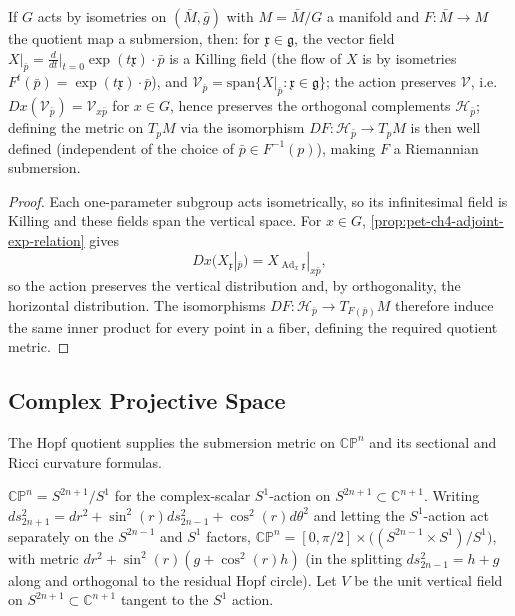 \begin{proposition}
  \label{prop:pet-ch4-group-action-submersion}
  If $G$ acts by isometries on $(\bar M,\bar g)$ with $M=\bar M/G$ a manifold
  and $F:\bar M\to M$ the quotient map a submersion, then: for
  $\mathfrak x\in\mathfrak g$, the vector field
  $X|_{\bar p}=\tfrac{d}{dt}\big|_{t=0}\exp(t\mathfrak x)\cdot\bar p$ is a
  Killing field (the flow of $X$ is by isometries $F^t(\bar p)=\exp(t\mathfrak x)\cdot\bar p$),
  and $\mathcal V_{\bar p}=\mathrm{span}\{X|_{\bar p}:\mathfrak x\in\mathfrak g\}$;
  the action preserves $\mathcal V$, i.e.\ $Dx(\mathcal V_{\bar p})=\mathcal V_{x\bar p}$
  for $x\in G$, hence preserves the orthogonal complements $\mathcal H_{\bar p}$;
  defining the metric on $T_pM$ via the isomorphism $DF:\mathcal H_{\bar p}\to T_pM$
  is then well defined (independent of the choice of $\bar p\in F^{-1}(p)$),
  making $F$ a Riemannian submersion.
\end{proposition}
\begin{proof}
  \sketch
  Each one-parameter subgroup acts isometrically, so its infinitesimal field is
  Killing and these fields span the vertical space. For $x\in G$,
  \cref{prop:pet-ch4-adjoint-exp-relation} gives
  \[
    Dx(X_{\mathfrak x}|_{\bar p})
    =X_{\operatorname{Ad}_x\mathfrak x}|_{x\bar p},
  \]
  so the action preserves the vertical distribution and, by orthogonality, the
  horizontal distribution. The isomorphisms
  $DF:\mathcal H_{\bar p}\to T_{F(\bar p)}M$ therefore induce the same inner
  product for every point in a fiber, defining the required quotient metric.
\end{proof}


\subsection{Complex Projective Space}

The Hopf quotient supplies the submersion metric on $\mathbb{CP}^n$ and its
sectional and Ricci curvature formulas.

\begin{definition}
  \label{def:pet-ch4-cpn-submersion-setup}
  $\mathbb{CP}^n=S^{2n+1}/S^1$ for the complex-scalar $S^1$-action on
  $S^{2n+1}\subset\mathbb{C}^{n+1}$. Writing
  $ds_{2n+1}^2=dr^2+\sin^2(r)ds_{2n-1}^2+\cos^2(r)d\theta^2$ and letting the
  $S^1$-action act separately on the $S^{2n-1}$ and $S^1$ factors,
  $\mathbb{CP}^n=[0,\pi/2]\times\big((S^{2n-1}\times S^1)/S^1\big)$, with metric
  $dr^2+\sin^2(r)(g+\cos^2(r)h)$ (in the splitting $ds_{2n-1}^2=h+g$ along and
  orthogonal to the residual Hopf circle). Let $V$ be the unit vertical field
  on $S^{2n+1}\subset\mathbb{C}^{n+1}$ tangent to the $S^1$ action.
\end{definition}

